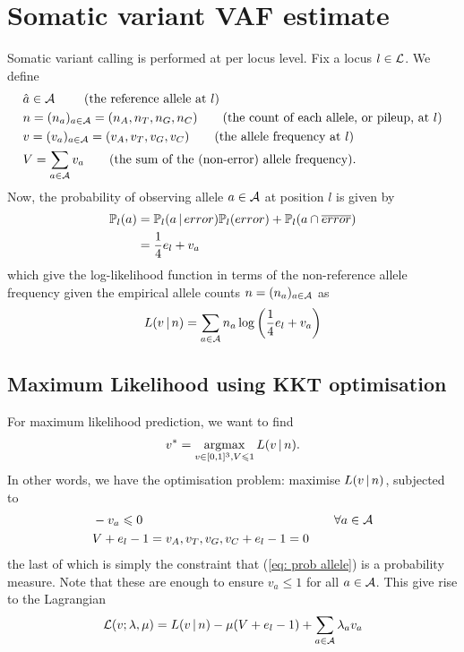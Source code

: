 \documentclass{article}
\begin{document}
\section{Somatic variant VAF estimate}
Somatic variant calling is performed at per locus level. Fix a locus $l \in {\cal{L}}$. We define
\begin{align*}
 & \hat{a} \in {\ensuremath {\cal A}} \tag*{ (the reference allele at $l$) } \\
 & n = (n_a)_{a \in {\ensuremath {\cal A}}} = (n_A, n_T, n_G, n_C) \tag*{(the count of each allele, or pileup, at $l$)} \\
 & v = (v_a)_{a \in {\ensuremath {\cal A}}} = (v_A, v_T, v_G, v_C) \tag*{(the allele frequency at $l$)} \\
 & V = \sum_{a \in {\ensuremath {\cal A}}} v_a  \tag*{(the sum of the (non-error) allele frequency)}.
\end{align*}
Now, the probability of observing allele $a \in {\ensuremath {\cal A}}$ at position $l$ is given by 
\begin{align}
{\ensuremath {\mathbb P}}_l(a) 
&= {\mathbb P}_l(a \, \vert \, error) {\mathbb P}_l(error) + {\mathbb P}_l(a \cap \overline{error}) \\
&= \frac{1}{4} e_l + v_a  \label{eq: prob allele}
\end{align}
which give the log-likelihood function in terms of the non-reference allele frequency given the empirical allele counts $n = (n_a)_{a \in {\ensuremath {\cal A}}} $ as
\begin{align}
L(v \, \vert \, n) =  \sum_{a \in {\ensuremath {\cal A}}} n_a \log\left(\frac{1}{4}e_l + v_a\right) \label{eq: loglikelihood}
\end{align}

\subsection{Maximum Likelihood using KKT optimisation}
For maximum likelihood prediction, we want to find 
\begin{align*}
v^* = \operatorname*{argmax}_{v \in [0, 1]^3, V \leqslant 1} L(v \, \vert \, n).
\end{align*}
In other words, we have the optimisation problem: maximise  $L(v \, \vert \, n)$, subjected to 
\begin{align*}
& - v_a \leqslant 0 &\quad  \forall a \in {\ensuremath {\cal A}}\\
& V + e_l -1 = v_A, v_T, v_G, v_C + e_l - 1 = 0 &
\end{align*}
the last of which is simply the constraint that (\ref{eq: prob allele}) is a probability measure. Note that these are enough to ensure $v_a \leq 1$ for all $a \in {\ensuremath {\cal A}}$.  
This give rise to the Lagrangian
\begin{align*}
{\cal{L}}(v; \lambda, \mu ) = L(v \, \vert \, n) - \mu(V + e_l -1) + \sum_{a \in {\ensuremath {\cal A}}} \lambda_a v_a 
\end{align*}
\end{document}
